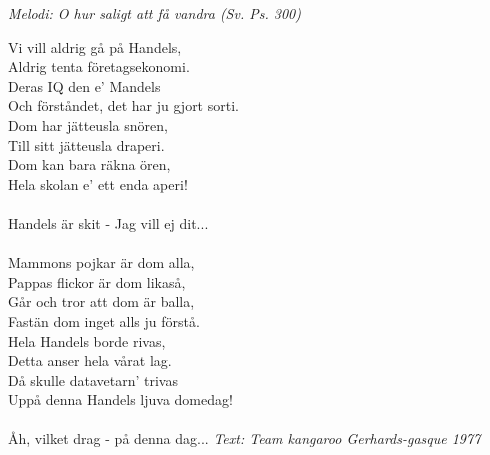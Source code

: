 {\footnotesize\textit{Melodi: O hur saligt att få vandra (Sv. Ps. 300)}}\par
\vspace{10pt}
\par
Vi vill aldrig gå på Handels,\\
Aldrig tenta företagsekonomi.\\
Deras IQ den e' Mandels\\
Och förståndet, det har ju gjort sorti.\\
Dom har jätteusla snören,\\
Till sitt jätteusla draperi.\\
Dom kan bara räkna ören,\\
Hela skolan e' ett enda aperi!\\
\\
Handels är skit - Jag vill ej dit...\\
\\
Mammons pojkar är dom alla,\\
Pappas flickor är dom likaså,\\
Går och tror att dom är balla,\\
Fastän dom inget alls ju förstå.\\
Hela Handels borde rivas,\\
Detta anser hela vårat lag.\\
Då skulle datavetarn' trivas\\
Uppå denna Handels ljuva domedag!\\
\\
Åh, vilket drag - på denna dag...
\pace{10pt}
{\footnotesize\textit{Text: Team kangaroo Gerhards-gasque 1977}}
